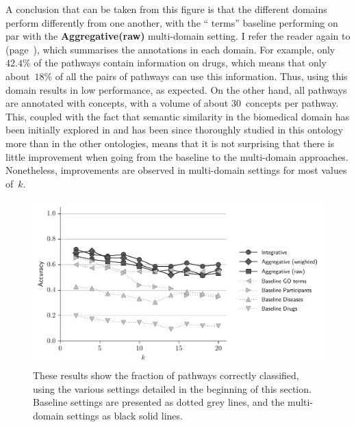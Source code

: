 A conclusion that can be taken from this figure is that the different domains perform differently from one another, with the `` terms'' baseline performing on par with the \textbf{Aggregative(raw)} multi-domain setting. I refer the reader again to  (page~\pageref{tab:biomodels-summary}), which summarises the annotations in each domain. For example, only~$42.4\%$ of the pathways contain information on drugs, which means that only about~$18\%$ of all the pairs of pathways can use this information. Thus, using this domain results in low performance, as expected. On the other hand, all pathways are annotated with  concepts, with a volume of about $30$~concepts per pathway. This, coupled with the fact that semantic similarity in the biomedical domain has been initially explored in  and has been since thoroughly studied in this ontology more than in the other ontologies, means that it is not surprising that there is little improvement when going from the  baseline to the multi-domain approaches. Nonetheless, improvements are observed in multi-domain settings for most values of~$k$.

\begin{figure}
    \centering
    \includegraphics[width=0.9\linewidth]{images/pathways-resnik.pdf}
    \caption[Semantic similarity in the Metabolic Pathways dataset]{These results show the fraction of pathways correctly classified, using the various settings detailed in the beginning of this section. Baseline settings are presented as dotted grey lines, and the multi-domain settings as black solid lines.}
    \label{fig:pathways}
\end{figure}

